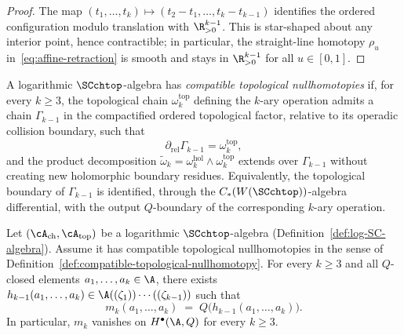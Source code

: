 \begin{proof}
The map $(t_1,\ldots,t_k)\mapsto (t_2-t_1,\ldots,t_k-t_{k-1})$ identifies the ordered
configuration modulo translation with $\R^{k-1}_{>0}$. This is star-shaped about any interior
point, hence contractible; in particular, the straight-line homotopy
$\rho_u$ in~\eqref{eq:affine-retraction} is smooth and stays in
$\R^{k-1}_{>0}$ for all $u\in[0,1]$.
\end{proof}

\begin{definition}
\label{def:compatible-topological-nullhomotopy}
A logarithmic $\SCchtop$-algebra has \emph{compatible topological
nullhomotopies} if, for every $k\ge3$, the topological chain
$\omega_k^{\mathrm{top}}$ defining the $k$-ary operation admits a
chain $\Gamma_{k-1}$ in the compactified ordered topological factor,
relative to its operadic collision boundary, such that
\[
\partial_{\mathrm{rel}}\Gamma_{k-1}=\omega_k^{\mathrm{top}},
\]
and the product decomposition
$\widetilde\omega_k=\omega_k^{\mathrm{hol}}\wedge\omega_k^{\mathrm{top}}$
extends over $\Gamma_{k-1}$ without creating new holomorphic
boundary residues. Equivalently, the topological boundary of
$\Gamma_{k-1}$ is identified, through the
$C_\ast(W(\SCchtop))$-algebra differential, with the output
$Q$-boundary of the corresponding $k$-ary operation.
\end{definition}

\begin{proposition}
\label{prop:m3_vanish}
Let $(\cA_{\mathrm{ch}}, \cA_{\mathrm{top}})$ be a logarithmic $\SCchtop$-algebra (Definition~\ref{def:log-SC-algebra}).
Assume it has compatible topological nullhomotopies in the sense of
Definition~\ref{def:compatible-topological-nullhomotopy}.
For every $k\ge3$ and all $Q$-closed elements $a_1,\ldots,a_k\in\A$,
there exists $h_{k-1}(a_1,\ldots,a_k)\in\A((\zeta_1))\cdots((\zeta_{k-1}))$ such that
\begin{equation}
\label{eq:higher-Q-exact}
m_k(a_1,\ldots,a_k)
\;=\;
Q\bigl(h_{k-1}(a_1,\ldots,a_k)\bigr).
\end{equation}
In particular, $m_k$ vanishes on $H^\bullet(\A,Q)$ for every $k\ge3$.
\end{proposition}

